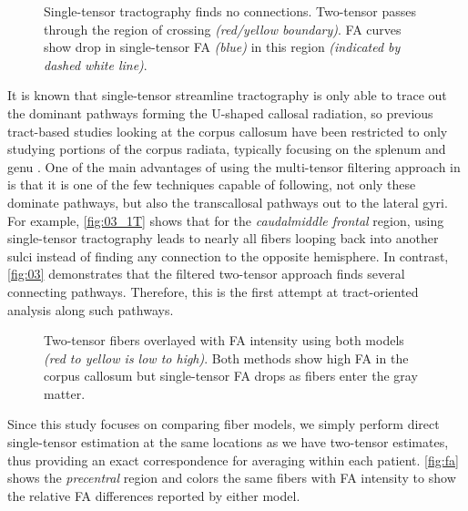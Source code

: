 \documentclass[final,hyperref]{gatech-thesis}
\newcommand{\region}[1]{\textit{#1}\xspace}
\newcommand{\green}{\region{caudalmiddle frontal}}
\newcommand{\blue}{\region{precentral}}
\begin{document}
\begin{figure}[t]
  \centering
  \quad
  \caption{Single-tensor tractography finds no connections.  Two-tensor passes
    through the region of crossing \textit{(red/yellow boundary)}.  FA curves
    show drop in single-tensor FA \textit{(blue)} in this region
    \textit{(indicated by dashed white line)}.}
  \label{fig:ds_1T}
\end{figure}
It is known that single-tensor streamline tractography is only able to trace
out the dominant pathways forming the U-shaped callosal radiation, so previous
tract-based studies looking at the corpus callosum have been restricted to
only studying portions of the corpus radiata, typically focusing on the
splenum and genu \cite{Corouge2006,Fletcher2007ipmi,Goodlett2008,Maddah2008}.
%
One of the main advantages of using the multi-tensor filtering approach in
\cite{malcolm2009ipmi} is that it is one of the few techniques capable of
following, not only these dominate pathways, but also the transcallosal
pathways out to the lateral gyri.  For example, \autoref{fig:03_1T} shows that
for the \green region, using single-tensor tractography leads to nearly all
fibers looping back into another sulci instead of finding any connection to
the opposite hemisphere.  In contrast, \autoref{fig:03} demonstrates that the
filtered two-tensor approach finds several connecting pathways.  Therefore,
this is the first attempt at tract-oriented analysis along such pathways.

\begin{figure}[t]
  \centering
  \caption{Two-tensor fibers overlayed with FA intensity using both models
    \textit{(red to yellow is low to high)}.  Both methods show high FA in the
    corpus callosum but single-tensor FA drops as fibers enter the gray
    matter.}
  \label{fig:fa}
\end{figure}
Since this study focuses on comparing fiber models, we simply perform direct
single-tensor estimation at the same locations as we have two-tensor
estimates, thus providing an exact correspondence for averaging within each
patient.  \autoref{fig:fa} shows the \blue region and colors the same fibers
with FA intensity to show the relative FA differences reported by either
model.
\end{document}
